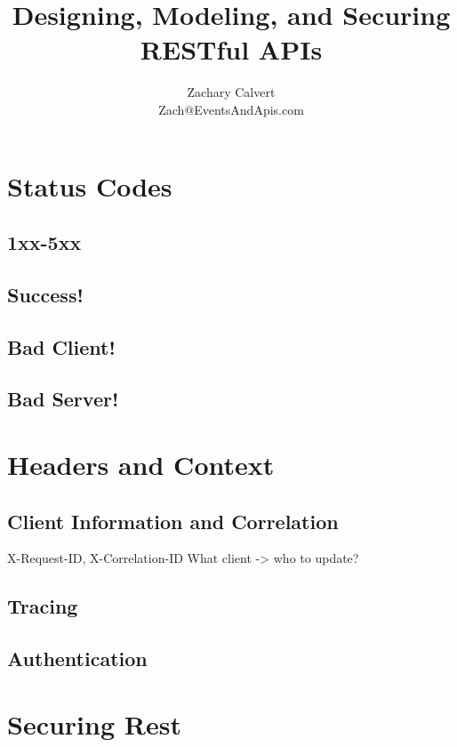 \documentclass[12pt,oneside]{book} %
\title{Designing, Modeling, and Securing \\ RESTful APIs}
\author{Zachary Calvert \\Zach@EventsAndApis.com }
\begin{document}
\maketitle

\frontmatter
\tableofcontents
\clearpage

\clearpage



\clearpage
\mainmatter
{}




\chapter{Status Codes}
\section{1xx-5xx}
\section{Success!}
\section{Bad Client!}
\section{Bad Server!}

\chapter{Headers and Context}
\section{Client Information and Correlation}
X-Request-ID, X-Correlation-ID
What client -> who to update?
\section{Tracing}
\section{Authentication}

\chapter{Securing Rest}
\end{document}
